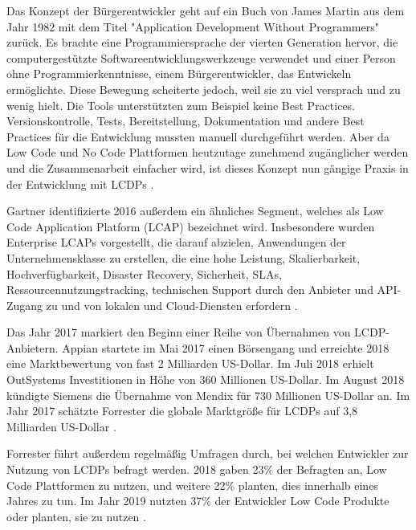 \documentclass[12pt]{article} %
\begin{document}
	Das Konzept der Bürgerentwickler geht auf ein Buch von James Martin aus dem Jahr 1982 mit dem Titel "Application Development Without Programmers" zurück. Es brachte eine Programmiersprache der vierten Generation hervor, die computergestützte Softwareentwicklungswerkzeuge verwendet und einer Person ohne Programmierkenntnisse, einem Bürgerentwickler, das Entwickeln ermöglichte. Diese Bewegung scheiterte jedoch, weil sie zu viel versprach und zu wenig hielt. Die Tools unterstützten zum Beispiel keine Best Practices. Versionskontrolle, Tests, Bereitstellung, Dokumentation und andere Best Practices für die Entwicklung mussten manuell durchgeführt werden. Aber da Low Code und No Code Plattformen heutzutage zunehmend zugänglicher werden und die Zusammenarbeit einfacher wird, ist dieses Konzept nun gängige Praxis in der Entwicklung mit LCDPs \autocite{KevinShuler.2023}. \newline
	
	Gartner identifizierte 2016 außerdem ein ähnliches Segment, welches als Low Code Application Platform (LCAP) bezeichnet wird. Insbesondere wurden Enterprise LCAPs vorgestellt, die darauf abzielen, Anwendungen der Unternehmensklasse zu erstellen, die eine hohe Leistung, Skalierbarkeit, Hochverfügbarkeit, Disaster Recovery, Sicherheit, SLAs, Ressourcennutzungstracking, technischen Support durch den Anbieter und API-Zugang zu und von lokalen und Cloud-Diensten erfordern \autocite{DiRuscio.2022}. \newline %
	
	Das Jahr 2017 markiert den Beginn einer Reihe von Übernahmen von LCDP-Anbietern. Appian startete im Mai 2017 einen Börsengang und erreichte 2018 eine Marktbewertung von fast 2 Milliarden US-Dollar. Im Juli 2018 erhielt OutSystems Investitionen in Höhe von 360 Millionen US-Dollar. Im August 2018 kündigte Siemens die Übernahme von Mendix für 730 Millionen US-Dollar an. Im Jahr 2017 schätzte Forrester die globale Marktgröße für LCDPs auf 3,8 Milliarden US-Dollar \autocite{DiRuscio.2022}. \newline 
		
	Forrester führt außerdem regelmäßig Umfragen durch, bei welchen Entwickler zur Nutzung von LCDPs befragt werden. 2018 gaben 23\% der Befragten an, Low Code Plattformen zu nutzen, und weitere 22\% planten, dies innerhalb eines Jahres zu tun. Im Jahr 2019 nutzten 37\% der Entwickler Low Code Produkte oder planten, sie zu nutzen \autocite{DiRuscio.2022}.\newline
	
\end{document}
